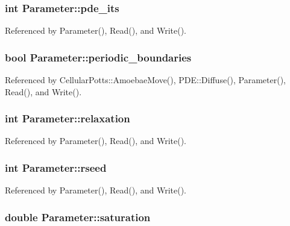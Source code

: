 \subsubsection[{pde\-\_\-its}]{\setlength{\rightskip}{0pt plus 5cm}int Parameter\-::pde\-\_\-its}\label{classParameter_ac8b28cf98a3fd3d968e70380e5dd3a98}


Referenced by Parameter(), Read(), and Write().

\subsubsection[{periodic\-\_\-boundaries}]{\setlength{\rightskip}{0pt plus 5cm}bool Parameter\-::periodic\-\_\-boundaries}\label{classParameter_a55f9594e40df76174643fb30f26e944c}


Referenced by Cellular\-Potts\-::\-Amoebae\-Move(), P\-D\-E\-::\-Diffuse(), Parameter(), Read(), and Write().

\subsubsection[{relaxation}]{\setlength{\rightskip}{0pt plus 5cm}int Parameter\-::relaxation}\label{classParameter_aa6d28d768aa21496ac9c776aa20dfd63}


Referenced by Parameter(), Read(), and Write().

\subsubsection[{rseed}]{\setlength{\rightskip}{0pt plus 5cm}int Parameter\-::rseed}\label{classParameter_a14a5bc515660de8d834f6a1dac4149c6}


Referenced by Parameter(), Read(), and Write().

\subsubsection[{saturation}]{\setlength{\rightskip}{0pt plus 5cm}double Parameter\-::saturation}\label{classParameter_a9decf7ab300d9a52c96a63cf742b1ffd}


